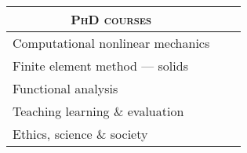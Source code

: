 \documentclass[a4paper,10pt]{article} %
\begin{document}
\begin{center}
\begin{tabular}{lcc}
\multicolumn{1}{c}{\textsc{PhD courses}} & \\
\hline
Computational nonlinear mechanics & \\
Finite element method --- solids & \\
Functional analysis & \\
Teaching learning \& evaluation & \\
Ethics, science \& society & 
\end{tabular}
\end{center}


\end{document}

